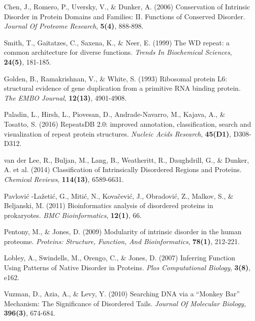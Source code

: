 \documentclass[a4,center,fleqn]{NAR}
\begin{document}
\begin{thebibliography}{4}
Chen, J., Romero, P., Uversky, V., \& Dunker, A. (2006)
Conservation of Intrinsic Disorder in Protein Domains and Families:  II. Functions of Conserved Disorder.
\textit{Journal Of Proteome Research}, \textbf{5(4)}, 888-898.

Smith, T., Gaitatzes, C., Saxena, K., \& Neer, E. (1999)
The WD repeat: a common architecture for diverse functions.
\textit{Trends In Biochemical Sciences}, \textbf{24(5)}, 181-185. 

Golden, B., Ramakrishnan, V., \& White, S. (1993)
Ribosomal protein L6: structural evidence of gene duplication from a primitive RNA binding protein. 
\textit{The EMBO Journal}, \textbf{12(13)}, 4901-4908. 

Paladin, L., Hirsh, L., Piovesan, D., Andrade-Navarro, M., Kajava, A., \& Tosatto, S. (2016)
RepeatsDB 2.0: improved annotation, classification, search and visualization of repeat protein structures.
\textit{Nucleic Acids Research}, \textbf{45(D1)}, D308-D312. 

van der Lee, R., Buljan, M., Lang, B., Weatheritt, R., Daughdrill, G., \& Dunker, A. et al. (2014)
Classification of Intrinsically Disordered Regions and Proteins. 
\textit{Chemical Reviews}, \textbf{114(13)}, 6589-6631. 

Pavlovi\'{c} -La\v{z}eti\'{c}, G., Miti\'{c}, N., Kova\v{c}evi\'{c}, J., Obradovi\'{c}, Z., Malkov, S., \& Beljanski, M. (2011)
Bioinformatics analysis of disordered proteins in prokaryotes. 
\textit{BMC Bioinformatics}, \textbf{12(1)}, 66. 

Pentony, M., \& Jones, D. (2009)
Modularity of intrinsic disorder in the human proteome. 
\textit{Proteins: Structure, Function, And Bioinformatics}, \textbf{78(1)}, 212-221. %

Lobley, A., Swindells, M., Orengo, C., \& Jones, D. (2007)
Inferring Function Using Patterns of Native Disorder in Proteins. 
\textit{Plos Computational Biology}, \textbf{3(8)}, e162.

Vuzman, D., Azia, A., \& Levy, Y. (2010)
Searching DNA via a “Monkey Bar” Mechanism: The Significance of Disordered Tails.
\textit{Journal Of Molecular Biology}, \textbf{396(3)}, 674-684.


\end{thebibliography}
\end{document}
